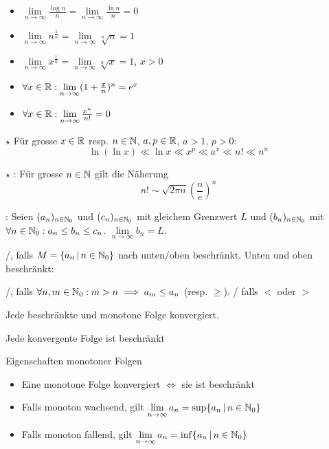 \Satz {}
\vspace{-0.6em}
\begin{itemize}
    \item $\lim\limits_{n\to\infty} \frac{\log n}{n} = \lim\limits_{n\to\infty} \frac{\ln n}{n} =0$
    \item $\lim\limits_{n\to\infty} n^\frac{1}{n} = \lim\limits_{n\to\infty} \sqrt[n]{n} = 1$
    \item $\lim\limits_{n\to\infty} x^\frac{1}{n} = \lim\limits_{n\to\infty} \sqrt[n]{x} = 1$, $x > 0$
    \item $\forall x \in \mathbb{R} : \lim\limits_{n\to\infty} (1 + \frac{x}{n})^n = e^x$
    \item $\forall x \in \mathbb{R} : \lim\limits_{n\to\infty} \frac{x^n}{n!} = 0$
\end{itemize}

\Satz $\star$ Für grosse $x \in \mathbb{R}$ resp. $n \in \mathbb{N}$, $a, p \in \mathbb{R}$, $a > 1$, $p > 0$:
$$\ln(\ln x) \ll \ln x \ll x^p \ll a^x \ll n! \ll n^n$$

\Satz $\star$ : Für grosse $n \in \mathbb{N}$ gilt die Näherung
$$n! \sim \sqrt{2\pi n} \left(\frac{n}{e}\right)^n$$

\Satz {}:
Seien $(a_n)_{n\in\mathbb{N}_0}$ und $(c_n)_{n\in\mathbb{N}_0}$ mit gleichem Grenzwert $L$ und
$(b_n)_{n\in\mathbb{N}_0}$ mit $\forall n \in \mathbb{N}_0 : a_n\le b_n\le c_n$. $\lim\limits_{n\to\infty} b_n = L$.

\Def {}/, falls $M = \{a_n \, | \, n \in \mathbb{N}_0\}$
nach unten/oben beschränkt. Unten und oben beschränkt: 

\Def {}/,
falls $\forall n,m \in \mathbb{N}_0 : m > n \implies a_m\le a_n$ (resp. $\geq$).
/ falls $<$ oder $>$

\Satz Jede beschränkte und monotone Folge konvergiert.

\Satz Jede konvergente Folge ist beschränkt

\Satz Eigenschaften monotoner Folgen
\vspace{-0.6em}
\begin{itemize}
    \item Eine monotone Folge konvergiert $\iff$ sie ist beschränkt
    \item Falls monoton wachsend, gilt $\lim\limits_{n\to\infty}a_n = \sup\{a_n \, | \, n \in \mathbb{N}_0\}$
    \item Falls monoton fallend, gilt $\lim\limits_{n\to\infty}a_n = \inf\{a_n \, | \, n \in \mathbb{N}_0\}$
\end{itemize}

